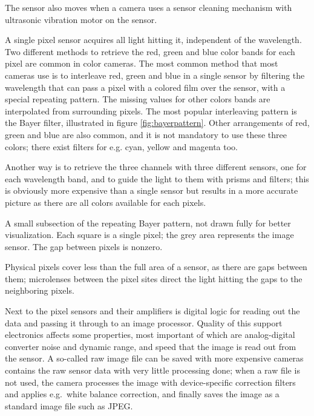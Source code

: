 The sensor also moves when a camera uses a sensor cleaning mechanism with ultrasonic vibration motor on the sensor.


A single pixel sensor acquires all light hitting it, independent of the wavelength.
Two different methods to retrieve the red, green and blue color bands for each pixel are common in color cameras.
The most common method that most cameras use is to interleave red, green and blue in a single sensor by filtering the wavelength that can pass a pixel with a colored film over the sensor, with a special repeating pattern.
The missing values for other colors bands are interpolated from surrounding pixels.
The most popular interleaving pattern is the Bayer filter, illustrated in figure \ref{fig:bayerpattern}.
Other arrangements of red, green and blue are also common, and it is not mandatory to use these three colors; there exist filters for e.g. cyan, yellow and magenta too.

Another way is to retrieve the three channels with three different sensors, one for each wavelength band, and to guide the light to them with prisms and filters; this is obviously more expensive than a single sensor but results in a more accurate picture as there are all colors available for each pixels.

{A small subsection of the repeating Bayer pattern, not drawn fully for better visualization. Each square is a single pixel; the grey area represents the image sensor. The gap between pixels is nonzero.}


Physical pixels cover less than the full area of a sensor, as there are gaps between them;
microlenses between the pixel sites direct the light hitting the gaps to the neighboring pixels.


Next to the pixel sensors and their amplifiers is digital logic for reading out the data and passing it through to an image processor.
Quality of this support electronics affects some properties, most important of which are analog-digital converter noise and dynamic range, and speed that the image is read out from the sensor.
A so-called raw image file can be saved with more expensive cameras contains the raw sensor data with very little processing done;
when a raw file is not used, the camera processes the image with device-specific correction filters and applies e.g.~white balance correction, and finally saves the image as a standard image file such as JPEG.

